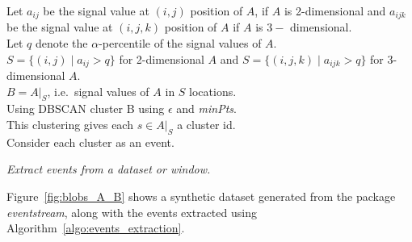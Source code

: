 \documentclass[a4paper,11pt]{article}
\begin{document}
\DontPrintSemicolon
\begin{algorithm}\fontsize{9}{10}\selectfont
	Let $a_{ij}$ be the signal value at $(i, j)$ position of $A$, if $A$ is 2-dimensional and $a_{ijk}$ be the signal value at $(i, j, k)$ position of $A$ if $A$ is $3-$ dimensional. \\
	Let $q$ denote the $\alpha$-percentile of the signal values of $A$. \\
	$S = \{ (i,j) \mid a_{ij} > q \}$ for 2-dimensional $A$ and
	$S = \{ (i,j, k) \mid a_{ijk} > q \}$ for 3-dimensional $A$. \\
	$ B = A|_S$, i.e.\ signal values of $A$ in $S$ locations. \\
	Using DBSCAN cluster B using $\epsilon$ and \textit{minPts}. \\
	This clustering gives each $s \in A|_S$ a cluster id. \\

	Consider each cluster as an event. \,
	\caption{\itshape Extract events from a dataset or window.}
	\label{algo:events_extraction}
\end{algorithm}

Figure~\ref{fig:blobs_A_B} shows a  synthetic dataset generated from the package \textit{eventstream}, along with the events extracted using Algorithm~\ref{algo:events_extraction}.
\end{document}
